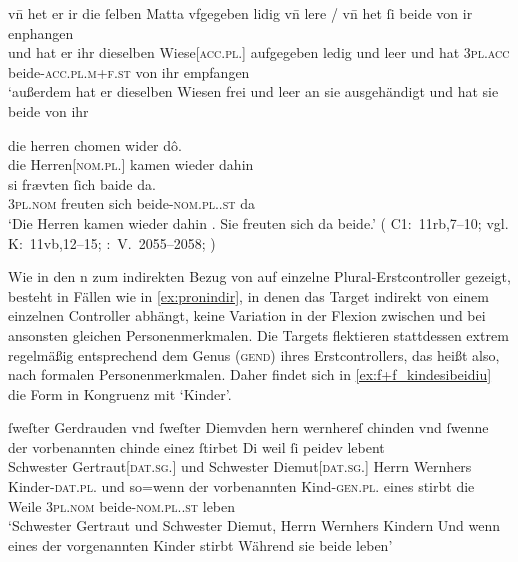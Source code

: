 \begin{exe}
\ex \label{ex:pronindir}
	\begin{xlist}
	\ex \label{ex:pronindir_1}
		\gll vn̄ het er ir {die ſelben} Matta vfgegeben lidig vn̄ lere /
			vn̄ het ſi beide von ir enphangen \\
		und hat er ihr dieselben Wiese[\textsc{acc.pl.\FemI}] aufgegeben ledig
			und leer {} und hat \textsc{3pl\subI.acc}
			beide-\textsc{acc.pl.m+f\subI.st} von ihr empfangen \\
		\trans `außerdem hat er dieselben Wiesen frei und leer an sie
			ausgehändigt und hat sie beide von ihr 
			\parencites(Nr.~2733, Freiburg i.\,Br., 1297)[105,23--24]{cao4}

	\ex \label{ex:pronindir_2}
		\gll die herren chomen wider dô. \\
			die Herren[\textsc{nom.pl.\MascM}] kamen wieder dahin \\
			\textelp{}
	\sn \gll si frævten ſich baide da. \\
			\textsc{3pl\subM.nom} freuten sich beide-\textsc{nom.pl.\MascM.st}
			da \\
		\trans `Die Herren kamen wieder dahin \textelp{}. Sie freuten sich da
			beide.'
			(%
				C1:~11rb,7--10; vgl.
				K:~11vb,12--15;
				\KC:~V.~2055--2058;
				\cite[119]{schroeder1895}%
			)
	\end{xlist}
\end{exe}

Wie in den n
 zum indirekten
Bezug von  auf einzelne Plural-Erstcontroller gezeigt, besteht in
Fällen wie in \cref{ex:pronindir}, in denen das Target indirekt von einem
einzelnen Controller abhängt, keine Variation in der Flexion zwischen
 und  bei ansonsten gleichen Personenmerkmalen. Die
Targets flektieren stattdessen extrem regelmäßig entsprechend dem Genus
(\textsc{gend}) ihres Erstcontrollers, das heißt also, nach formalen
Personenmerkmalen. Daher findet sich in \cref{ex:f+f_kindesibeidiu} die Form
 in Kongruenz mit  `Kinder'.

\begin{exe}
\ex \label{ex:f+f_kindesibeidiu}
	\gll ſweſter Gerdrauden vnd ſweſter Diemvden hern wernhereſ chinden
			\textelp{} vnd ſwenne der vorbenannten chinde einez ſtirbet
			\textelp{} Di weil ſi peidev lebent \\
		Schwester Gertraut[\textsc{dat.sg.\FemF}] und Schwester
			Diemut[\textsc{dat.sg.\FemF}] Herrn Wernhers
			Kinder-\textsc{dat.pl.\NeutF} {} und so=wenn der vorbenannten
			Kind-\textsc{gen.pl.\NeutF} eines stirbt {} die Weile
			\textsc{3pl\subF.nom} beide-\textsc{nom.pl.\NeutF.st} leben \\
	\trans `Schwester Gertraut und Schwester Diemut, Herrn Wernhers Kindern
		\textelp{} Und wenn eines der vorgenannten Kinder stirbt \textelp{}
		Während sie beide leben'
		\parencites(Nr.~2960, Engelthal, Kr.~Nürnberger Land, 1298)[240,31--38]{cao4}
\end{exe}

